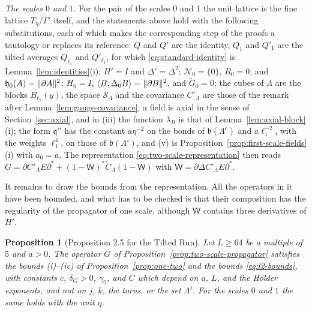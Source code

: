 \documentclass[11pt]{preprint}
\DeclarePairedDelimiter{\norm}{\lVert}{\rVert}
\numberwithin{equation}{section}
\newtheorem{proposition}[theorem]{Proposition}
\theoremstyle{definition}
\theoremstyle{remark}
\theoremstyle{plain}
\begin{document}
\emph{The scales $0$ and $1$.} For the pair of the scales $0$ and $1$ the unit lattice is the fine lattice $T_\eta/\Gamma'$ itself, and the statements above hold with the following substitutions, each of which makes the corresponding step of the proofs a tautology or replaces its reference: $Q$ and $Q'$ are the identity, $Q_1$ and $Q'_1$ are the tilted averages $Q_{\ell_1}$ and $Q'_{\ell_1}$, for which \eqref{eq:standard-identity} is Lemma~\ref{lem:identities}(i); $H' = I$ and $\Delta' = \Delta^2$; $\mathcal N_0 = \{ 0 \}$, $R_0 = 0$, and $\mathfrak h_0(A) = \norm{\partial A}^2$; $H_0 = I$, $\langle B, \Delta_0B\rangle = \norm{\partial B}^2$, and $\tilde G_0 = 0$; the cubes of $\Lambda$ are the blocks $B_{\ell_1}(y)$, the space $\mathcal S_\Lambda$ and the covariance $C'_\Lambda$ are those of the remark after Lemma~\ref{lem:gauge-covariance}, a field is axial in the sense of Section~\ref{sec:axial}, and in (iii) the function $\lambda_B$ is that of Lemma~\ref{lem:axial-block}(i); the form $\mathfrak q''$ has the constant $a\eta^{-2}$ on the bonds of $\mathfrak b(\Lambda^c)$ and $a\ell_1^{-2}$, with the weights $\ell_1^4$, on those of $\mathfrak b(\Lambda')$, and (v) is Proposition~\ref{prop:first-scale-fields}(i) with $a_0 = a$. The representation \eqref{eq:two-scale-representation} then reads $G = \partial C'_\Lambda E\partial^* + (1 - \mathsf W)^*\tilde C_\Lambda(1 - \mathsf W)$ with $\mathsf W = \partial\Delta C'_\Lambda E\partial^*$.

It remains to draw the bounds from the representation. All the operators in it have been bounded, and what has to be checked is that their composition has the regularity of the propagator of one scale, although $\mathsf W$ contains three derivatives of $H'$.

\begin{proposition}[Proposition 2.5 for the Tilted Run]\label{prop:two-scale-bounds}
Let $L \geq 64$ be a multiple of $5$ and $a > 0$. The operator $G$ of Proposition~\ref{prop:two-scale-propagator} satisfies the bounds (i)--(iv) of Proposition~\ref{prop:one-two} and the bounds \eqref{eq:l2-bounds}, with constants $c$, $\delta_G > 0$, $\gamma_0$, and $C$ which depend on $a$, $L$, and the H\"older exponents, and not on $j$, $k$, the torus, or the set $\Lambda'$. For the scales $0$ and $1$ the same holds with the unit $\eta$.
\end{proposition}
\end{document}

